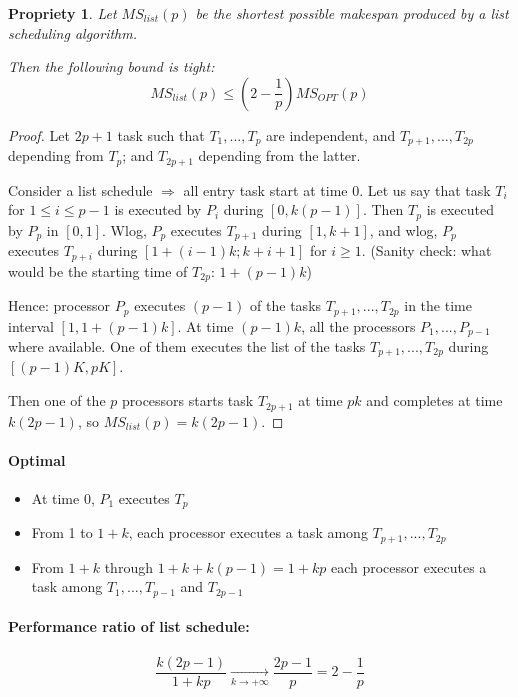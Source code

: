 \documentclass{article}
\newtheorem{prop}{Propriety}
\begin{document}
\begin{prop}
Let $MS_{list}(p)$ be the shortest possible makespan produced by a list scheduling algorithm.

Then the following bound is tight:
\[MS_{list} (p) \leq \left( 2 - \frac{1}{p}\right) MS_{OPT}(p)\]
\end{prop}

\begin{proof}
Let $2p+1$ task such that $T_1,...,T_{p}$ are independent, and $T_{p+1},...,T_{2p}$ depending from $T_p$; and $T_{2p+1}$ depending from the latter.

Consider a list schedule $\Rightarrow$ all entry task start at time 0. Let us say that task $T_i$ for $1\leq i\leq p-1$ is executed by $P_i$ during $[0,k(p-1)]$. Then $T_p$ is executed by $P_p$ in $[0,1]$. Wlog, $P_p$ executes $T_{p+1}$ during $[1, k+1]$, and wlog, $P_p$ executes $T_{p+i}$ during $[1+(i-1)k;k+i+1]$ for $i\geq 1$. (Sanity check: what would be the starting time of $T_{2p}$: $1+(p-1)k$)

Hence: processor $P_p$ executes $(p-1)$ of the tasks $T_{p+1},...,T_{2p}$ in the time interval $[1,1+(p-1)k]$. At time $(p-1)k$, all the processors $P_1,...,P_{p-1}$ where available. One of them executes the list of the tasks $T_{p+1},...,T_{2p}$ during $[(p-1)K,pK]$.


Then one of the $p$ processors starts task $T_{2p+1}$ at time $pk$ and completes at time $k(2p-1)$, so $MS_{list}(p)=k(2p-1)$. 
\end{proof}

\paragraph{Optimal}
\begin{itemize}
\item At time 0, $P_1$ executes $T_p$
\item From 1 to $1+k$, each processor executes a task among $T_{p+1},...,T_{2p}$
\item From $1+k$ through $1+k+k(p-1)=1+kp$ each processor executes a task among $T_1,...,T_{p-1}$ and $T_{2p-1}$
\end{itemize}


\paragraph{Performance ratio of list schedule:}
\[\frac{k(2p-1)}{1+kp}\underset{k \to + \infty}{\longrightarrow} \frac{2p-1}{p}=2-\frac{1}{p}\]
\end{document}
